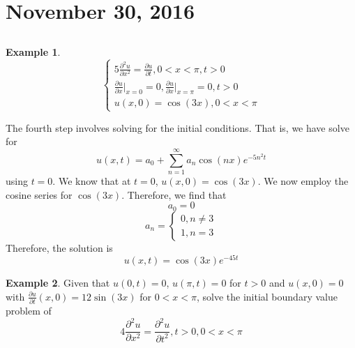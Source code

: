 \documentclass[11pt]{article}
\theoremstyle{plain} %
\theoremstyle{definition}
\theoremstyle{example}
\newtheorem*{example}{Example}
\theoremstyle{remark}
\begin{document}
\section{November 30, 2016}
\subsection{}
\begin{example}
$$\begin{cases}5\frac{\partial^2u}{\partial x^2} = \frac{\partial u}{\partial t}, 0 < x < \pi, t > 0\\
\frac{\partial u}{\partial x}\Big|_{x=0} = 0, \frac{\partial u}{\partial x}\Big|_{x=\pi} = 0, t > 0\\
u(x,0) = \cos(3x), 0 < x < \pi\end{cases}$$
\end{example}

The fourth step involves solving for the initial conditions. That is, we have solve for
$$u(x,t) = a_0 + \sum_{n=1}^{\infty}a_n\cos(nx)e^{-5n^2t}$$ using $t=0$. We know that at $t=0$, $u(x,0) = \cos(3x)$. We now employ the cosine series for $\cos(3x)$. Therefore, we find that $$a_0 = 0$$ $$a_n = \begin{cases}0, n \neq 3 \\ 1, n = 3\end{cases}$$ Therefore, the solution is $$u(x,t) = \cos(3x)e^{-45t}$$

\begin{example}
Given that $u(0,t) = 0$, $u(\pi, t) = 0$ for $t>0$ and $u(x,0) = 0$ with $\frac{\partial u}{\partial t}(x,0) = 12\sin(3x)$ for $ 0 < x < \pi$, solve the initial boundary value problem of $$4\frac{\partial^2 u}{\partial x^2} = \frac{\partial^2 u}{\partial t^2}, t > 0, 0 < x < \pi$$
\end{example}
\end{document}
